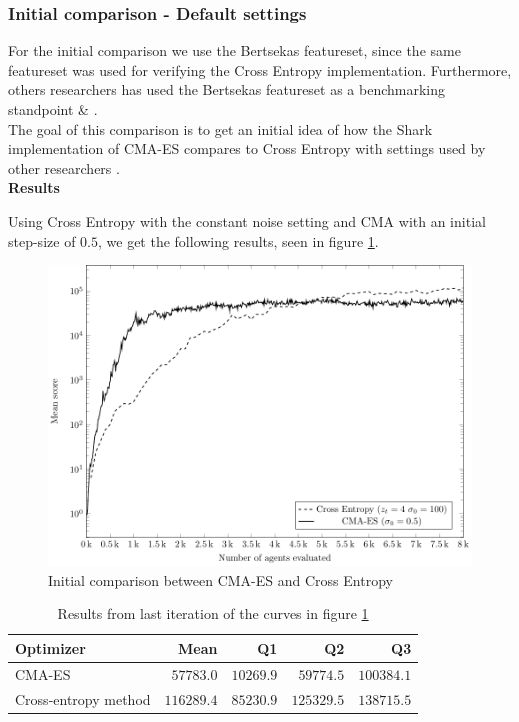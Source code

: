 \subsubsection{Initial comparison - Default settings \label{sec:initialCompare}}
For the initial comparison we use the Bertsekas featureset, since the same featureset
was used for verifying the Cross Entropy implementation. Furthermore, others researchers
has used the Bertsekas featureset as a benchmarking standpoint \citep{thiery:09} \&
\citep{szita:06}.\\
The goal of this comparison is to get an initial idea of how the Shark implementation of
CMA-ES compares to Cross Entropy with settings used by other researchers \citep{thiery:09}.\\

\textbf{Results}

Using Cross Entropy with the constant noise setting and CMA with an initial step-size
of $0.5$, we get the following results, seen in figure \ref{fig:CMA_VS_CE_00}.\\

\begin{figure}[H]
\begin{center}
\includegraphics[scale=0.8]{plots/cmaCePlot}
\end{center}
\caption{Initial comparison between CMA-ES and Cross Entropy \label{fig:CMA_VS_CE_00}}
\end{figure}

\begin{table}[H]
\centering
\small
\begin{tabular}{l r r r r}
Optimizer & Mean & Q1 & Q2 & Q3\\
\hline
CMA-ES  & $57783.0$ & $10269.9$ & $59774.5$ & $100384.1$\\
Cross-entropy method & $116289.4$ & $85230.9$ & $125329.5$ & $138715.5$\\
\end{tabular}
\caption{Results from last iteration of the curves in figure \ref{fig:CMA_VS_CE_00}
\label{table:initialResultTable}}
\end{table}

